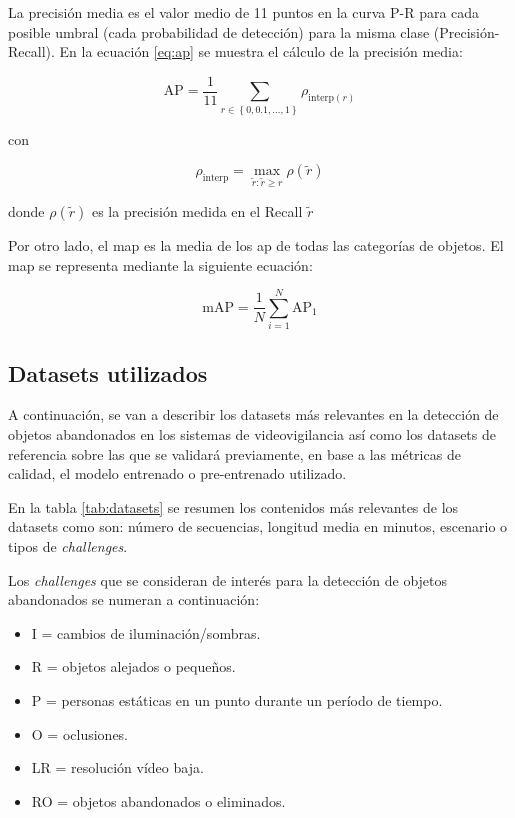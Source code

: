 La precisión media es el valor medio de 11 puntos en la curva P-R para cada posible umbral (cada probabilidad de detección) para la misma clase (Precisión-Recall). En la ecuación \ref{eq:ap} se muestra el cálculo de la precisión media:

\begin{equation}
\label{eq:ap}
\text{AP}=\frac{1}{11} \sum_{r\in \left \{ 0, 0.1, ...,1 \right \}}\rho_{\text{interp}\left ( r \right )}
\end{equation}

con

$$\rho_{\text{interp}} = \max_{\tilde{r}:\tilde{r} \geq r} \rho\left ( \tilde{r} \right )$$

donde $\rho\left ( \tilde{r} \right )$ es la precisión medida en el Recall $\tilde{r}$

Por otro lado, el \gls{map} es la media de los \gls{ap} de todas las categorías de objetos. El \gls{map} se representa mediante la siguiente ecuación:

\begin{equation}
\label{eq:map}
\text{mAP} = \frac{1}{N} \sum_{i=1}^{N} \text{AP}_{1}
\end{equation}

\subsection{Datasets utilizados}
\label{subsec:datasets-utilizados}

A continuación, se van a describir los datasets más relevantes en la detección de objetos abandonados en los sistemas de videovigilancia así como los datasets de referencia sobre las que se validará previamente, en base a las métricas de calidad, el modelo entrenado o pre-entrenado utilizado.

En la tabla \ref{tab:datasets} se resumen los contenidos más relevantes de los datasets como son: número de secuencias, longitud media en minutos, escenario o tipos de \textit{challenges}.

Los \textit{challenges} que se consideran de interés para la detección de objetos abandonados se numeran a continuación:

\begin{itemize}
    \item I = cambios de iluminación/sombras.
    \item R = objetos alejados o pequeños.
    \item P = personas estáticas en un punto durante un período de tiempo.
    \item O = oclusiones.
    \item LR = resolución vídeo baja.
    \item RO = objetos abandonados o eliminados.
\end{itemize}


